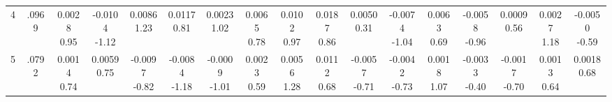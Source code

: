 \begin{landscape}
\begin{center}
{\begin{adjustbox}{max width=\textheight}
\begin{tabular}{lcccccccccccccccc}
4 & .0969 & \shortstack{0.0028\\0.95} & \shortstack{-0.0104\\-1.12} & \shortstack{0.0086\\1.23} & \shortstack{0.0117\\0.81} & \shortstack{0.0023\\1.02} & \shortstack{0.0065\\0.78} & \shortstack{0.0102\\0.97} & \shortstack{0.0187\\0.86} & \shortstack{0.0050\\0.31} & \shortstack{-0.0074\\-1.04} & \shortstack{0.0063\\0.69} & \shortstack{-0.0058\\-0.96} & \shortstack{0.0009\\0.56} & \shortstack{0.0027\\1.18} & \shortstack{-0.0050\\-0.59} \\
5 & .0792 & \shortstack{0.0014\\0.74} & \shortstack{0.0059\\0.75} & \shortstack{-0.0097\\-0.82} & \shortstack{-0.0084\\-1.18} & \shortstack{-0.0009\\-1.01} & \shortstack{0.0023\\0.59} & \shortstack{0.0056\\1.28} & \shortstack{0.0112\\0.68} & \shortstack{-0.0057\\-0.71} & \shortstack{-0.0042\\-0.73} & \shortstack{0.0018\\1.07} & \shortstack{-0.0033\\-0.40} & \shortstack{-0.0017\\-0.70} & \shortstack{0.0013\\0.64} & \shortstack{0.0018\\0.68} \\

\end{tabular}
\end{adjustbox}}
\end{center}
\end{landscape}
